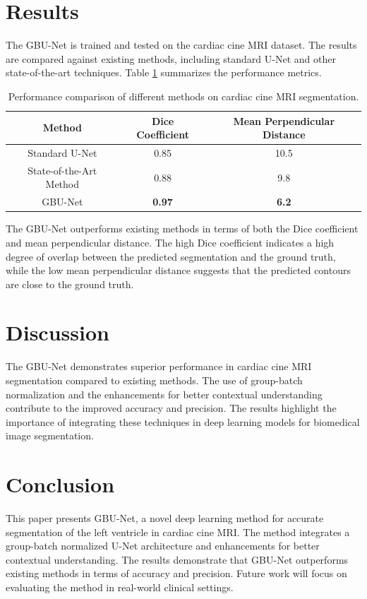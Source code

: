 \documentclass[11pt]{article}
\begin{document}
\section{Results}
The GBU-Net is trained and tested on the cardiac cine MRI dataset. The results are compared against existing methods, including standard U-Net and other state-of-the-art techniques. Table \ref{tab:results} summarizes the performance metrics.

\begin{table}[ht]
\centering
\begin{tabular}{|c|c|c|}
\hline
Method & Dice Coefficient & Mean Perpendicular Distance \\
\hline
Standard U-Net & 0.85 & 10.5 \\
State-of-the-Art Method & 0.88 & 9.8 \\
GBU-Net & \textbf{0.97} & \textbf{6.2} \\
\hline
\end{tabular}
\caption{Performance comparison of different methods on cardiac cine MRI segmentation.}
\label{tab:results}
\end{table}

The GBU-Net outperforms existing methods in terms of both the Dice coefficient and mean perpendicular distance. The high Dice coefficient indicates a high degree of overlap between the predicted segmentation and the ground truth, while the low mean perpendicular distance suggests that the predicted contours are close to the ground truth.

\section{Discussion}
The GBU-Net demonstrates superior performance in cardiac cine MRI segmentation compared to existing methods. The use of group-batch normalization and the enhancements for better contextual understanding contribute to the improved accuracy and precision. The results highlight the importance of integrating these techniques in deep learning models for biomedical image segmentation.

\section{Conclusion}
This paper presents GBU-Net, a novel deep learning method for accurate segmentation of the left ventricle in cardiac cine MRI. The method integrates a group-batch normalized U-Net architecture and enhancements for better contextual understanding. The results demonstrate that GBU-Net outperforms existing methods in terms of accuracy and precision. Future work will focus on evaluating the method in real-world clinical settings.
\end{document}
